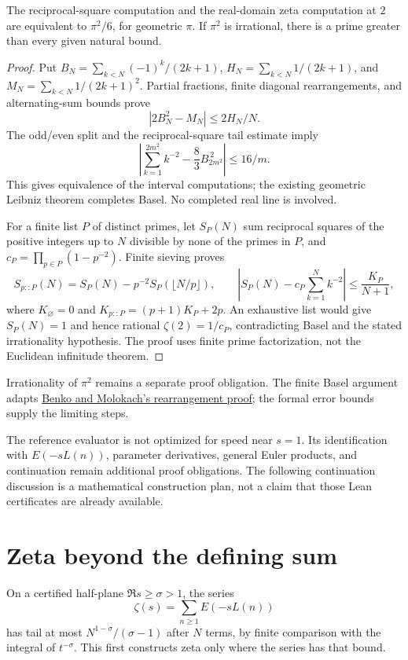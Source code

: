\begin{theorem}
\label{thm:basel-primes}
\leanok
The reciprocal-square computation and the real-domain zeta computation at $2$
are equivalent to $\pi^2/6$, for geometric $\pi$. If $\pi^2$ is irrational,
there is a prime greater than every given natural bound.
\end{theorem}
\begin{proof}
\leanok
Put $B_N=\sum_{k<N}(-1)^k/(2k+1)$, $H_N=\sum_{k<N}1/(2k+1)$, and
$M_N=\sum_{k<N}1/(2k+1)^2$. Partial fractions, finite diagonal rearrangements,
and alternating-sum bounds prove
\[
 |2B_N^2-M_N|\le 2H_N/N.
\]
The odd/even split and the reciprocal-square tail estimate imply
\[
 \left|\sum_{k=1}^{2m^2}k^{-2}-\frac83 B_{2m^2}^{\,2}\right|\le16/m.
\]
This gives equivalence of the interval computations; the existing geometric
Leibniz theorem completes Basel. No completed real line is involved.

For a finite list $P$ of distinct primes, let $S_P(N)$ sum reciprocal squares
of the positive integers up to $N$ divisible by none of the primes in $P$, and
$c_P=\prod_{p\in P}(1-p^{-2})$. Finite sieving proves
\[
 S_{p::P}(N)=S_P(N)-p^{-2}S_P(\lfloor N/p\rfloor),\qquad
 \left|S_P(N)-c_P\sum_{k=1}^N k^{-2}\right|\le\frac{K_P}{N+1},
\]
where $K_{\varnothing}=0$ and $K_{p::P}=(p+1)K_P+2p$.
An exhaustive list would give $S_P(N)=1$ and hence rational $\zeta(2)=1/c_P$,
contradicting Basel and the stated irrationality hypothesis. The proof uses
finite prime factorization, not the Euclidean infinitude theorem.
\end{proof}

Irrationality of $\pi^2$ remains a separate proof obligation. The finite Basel
argument adapts \href{https://doi.org/10.4169/college.math.j.44.3.171}{Benko and
Molokach's rearrangement proof}; the formal error bounds supply the limiting
steps.

The reference evaluator is not optimized for speed near $s=1$. Its identification
with $E(-sL(n))$, parameter derivatives, general Euler products, and continuation remain
additional proof obligations. The following continuation discussion is a
mathematical construction plan, not a claim that those Lean certificates are
already available.

\section{Zeta beyond the defining sum}
On a certified half-plane $\Re s\ge\sigma>1$, the series
\[
 \zeta(s)=\sum_{n\ge1}E(-sL(n))
\]
has tail at most $N^{1-\sigma}/(\sigma-1)$ after $N$ terms, by finite
comparison with the integral of $t^{-\sigma}$.  This first constructs
zeta only where the series has that bound.

